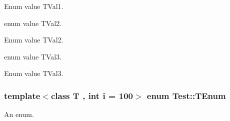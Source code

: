 \begin{Desc}
\begin{description}
Enum value T\+Val1. \item[{\em 
\hypertarget{class_test_ad8d13fe56b896633273087859b89a1a3a13b0433f996716c25158cecf9ee545c4}{}T\+Val2\label{class_test_ad8d13fe56b896633273087859b89a1a3a13b0433f996716c25158cecf9ee545c4}
}]enum value T\+Val2.

Enum value T\+Val2. \item[{\em 
\hypertarget{class_test_ad8d13fe56b896633273087859b89a1a3a5642b0033d6d17c4c9bee72133059f26}{}T\+Val3\label{class_test_ad8d13fe56b896633273087859b89a1a3a5642b0033d6d17c4c9bee72133059f26}
}]enum value T\+Val3.

Enum value T\+Val3. \end{description}
\end{Desc}
\hypertarget{class_test_ad8d13fe56b896633273087859b89a1a3}{}
\subsubsection[{T\+Enum}]{\setlength{\rightskip}{0pt plus 5cm}template$<$class T , int i = 100$>$ enum {\bf Test\+::\+T\+Enum}}\label{class_test_ad8d13fe56b896633273087859b89a1a3}


An enum. 

